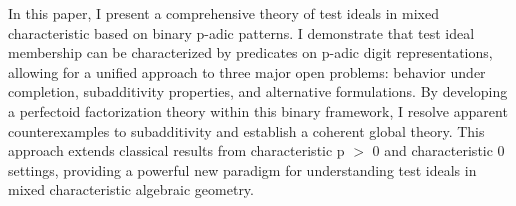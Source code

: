 In this paper, I present a comprehensive theory of test ideals in mixed characteristic based on binary p-adic patterns. I demonstrate that test ideal membership can be characterized by predicates on p-adic digit representations, allowing for a unified approach to three major open problems: behavior under completion, subadditivity properties, and alternative formulations. By developing a perfectoid factorization theory within this binary framework, I resolve apparent counterexamples to subadditivity and establish a coherent global theory. This approach extends classical results from characteristic p $>$ 0 and characteristic 0 settings, providing a powerful new paradigm for understanding test ideals in mixed characteristic algebraic geometry. 